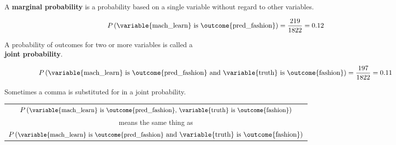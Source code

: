 \documentclass{beamer}
\newcommand{\prob}[1]{P\left({#1}\right)}
\newcommand{\jointprob}[3]{\prob{{#1}~\text{#2}~{#3}}}
\begin{document}
\begin{frame}
\begin{definition}
A \textbf{marginal probability} is a probability based on a single variable without regard to other variables.
\end{definition}\pause

\begin{example}
\begin{equation*}
\prob{\text{\variable{mach\_learn} is \outcome{pred\_fashion}}} = \dfrac{219}{1822} = 0.12
\end{equation*}\pause
\vspace{-3.5mm}
\end{example}

\begin{definition}
A probability of outcomes for two or more variables is called a\\ \textbf{joint probability}.
\end{definition}\pause

\begin{example}
\vspace{-4mm}
\begin{equation*}
\jointprob{\text{\variable{mach\_learn} is \outcome{pred\_fashion}}}{and}{\text{\variable{truth} is \outcome{fashion}}} = \dfrac{197}{1822} = 0.11
\end{equation*}
\vspace{-4.5mm}
\end{example}
\end{frame}

\begin{frame}
\begin{note}
Sometimes a comma is substituted for  in a joint probability.

\vspace{-1mm}
\begin{center}
\begin{tabular}{c}
$\prob{\small\text{\variable{mach\_learn} is \outcome{pred\_fashion}, \variable{truth} is \outcome{fashion}}}$ \\
means the same thing as \\
$\jointprob{\small\text{\variable{mach\_learn} is \outcome{pred\_fashion}}}{and}{\text{\variable{truth} is \outcome{fashion}}}$
\end{tabular}
\end{center}
\end{note}
\end{frame}
\end{document}
